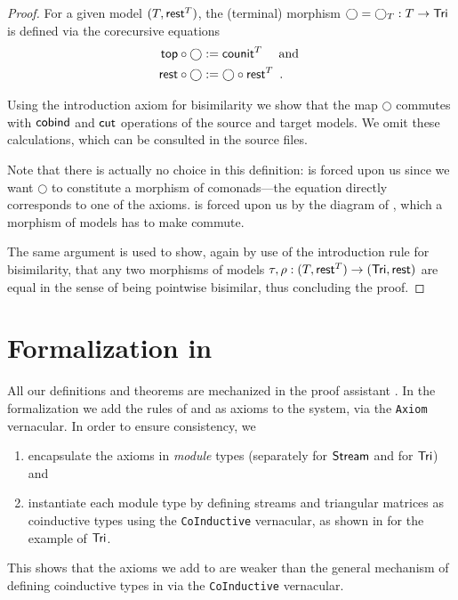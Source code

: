 \documentclass[a4paper,USenglish]{lipics}
\newcommand{\parencite}[1]{\cite{#1}}
\begin{document}
\begin{proof}
   For a given model $(T,\mathsf{rest}^T)$, the (terminal) morphism $\bigcirc = \bigcirc_T:T\to\mathsf{Tri}$ is defined via the corecursive equations
% 
   \begin{align}  {\ensuremath{\mathsf{top}}} \circ {\bigcirc} &:= \mathsf{counit}^T \quad \text{ and } \label{eq:terminal_top}\\
                   {\mathsf{rest}} \circ {\bigcirc} &:= {\bigcirc} \circ {\ensuremath{\mathsf{rest}}^T} \enspace . \label{eq:terminal_rest}
    \end{align}

  \noindent
      Using the introduction axiom for bisimilarity we show that the map $\bigcirc$ commutes with $\mathsf{cobind}$ and $\mathsf{cut}$ operations of the source and 
   target models. We omit these calculations, which can be consulted in the \coq source files.
   
   Note that there is actually no choice in this definition:  is forced upon us since we want $\bigcirc$ to constitute 
   a morphism of comonads---the equation directly corresponds to one of the axioms.
    is forced upon us by the diagram of , which a morphism of models has to make commute.
   
   The same argument is used to show, again by use of the introduction rule for bisimilarity, that any two morphisms of models $\tau,\rho : (T,\mathsf{rest}^T) \to (\mathsf{Tri},\mathsf{rest})$
   are equal in the sense of being pointwise bisimilar, thus concluding the proof.   
\end{proof}



\section{Formalization in \coq}\label{sec:formal}

All our definitions and theorems are mechanized in the proof assistant \coq \parencite{coq84pl4}.
In the formalization we add the rules of  and  as axioms to the \coq system, via the \lstinline!Axiom! vernacular. In order to ensure consistency, we 
\begin{enumerate}
 \item encapsulate the axioms in \coq \emph{module} types (separately for $\mathsf{Stream}$ and for $\mathsf{Tri}$) and
 \item instantiate each module type by defining streams and triangular matrices as coinductive types using the \lstinline!CoInductive! vernacular,
  as shown in  for the example of $\mathsf{Tri}$.
\end{enumerate}
This shows that the axioms we add to \coq are weaker than the general mechanism of defining coinductive types in \coq via the \lstinline!CoInductive! vernacular.
\end{document}

